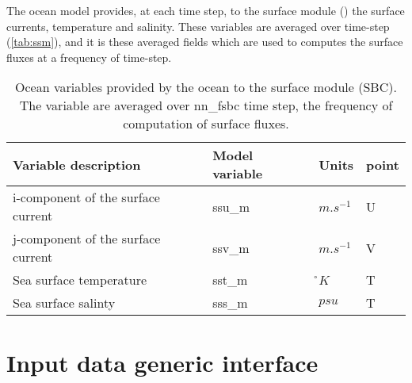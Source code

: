 \documentclass[../main/NEMO_manual]{subfiles}
\begin{document}
The ocean model provides, at each time step, to the surface module ()
the surface currents, temperature and salinity.  
These variables are averaged over  time-step (\autoref{tab:ssm}), and
it is these averaged fields which are used to computes the surface fluxes at a frequency of  time-step.


\begin{table}[tb]
  \begin{center}
    \begin{tabular}{|l|l|l|l|}
      \hline
      Variable description					& Model variable	& Units	& point \\	\hline
      i-component of the surface current	& ssu\_m	& $m.s^{-1}$	& U \\	\hline
      j-component of the surface current	& ssv\_m	& $m.s^{-1}$	& V \\	\hline
      Sea surface temperature				& sst\_m	& \r{}$K$		& T \\	\hline
      Sea surface salinty					& sss\_m	& $psu$			& T \\	\hline
    \end{tabular}
    \caption{
      \protect\label{tab:ssm}
      Ocean variables provided by the ocean to the surface module (SBC).
      The variable are averaged over nn{\_}fsbc time step,
      \ie the frequency of computation of surface fluxes.
    }
  \end{center}
\end{table}



\section{Input data generic interface}
\label{sec:SBC_input}
\end{document}
